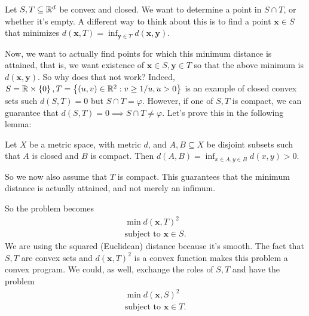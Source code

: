 Let $S,T\subseteq \mathbb{R}^d$ be convex and closed. We want to determine a point in $S\cap T$, or whether it's empty. A different way to think about this is to find a point $\pmb x\in S$ that minimizes $\displaystyle d(\pmb x,T) = \inf_{\pmb y\in T}d(\pmb x,\pmb y)$. 

Now, we want to actually find points for which this minimum distance is attained, that is, we want existence of $\pmb x\in S,\pmb y\in T$ so that the above minimum is $d(\pmb x,\pmb y)$. So why does that not work? Indeed, $S = \mathbb{R}\times \left\{0\right\}, T = \left\{(u,v)\in \mathbb{R}^2: v\geq 1/u, u>0\right\}$ is an example of closed convex sets such $d(S,T) = 0$ but $S\cap T = \varphi$. However, if one of $S,T$ is compact, we can guarantee that $d(S,T)=0\implies S\cap T \neq \varphi$. Let's prove this in the following lemma:

\begin{lemma}
Let $X$ be a metric space, with metric $d$, and $A,B\subseteq X$ be disjoint subsets such that $A$ is closed and $B$ is compact. Then $\displaystyle d(A,B) = \inf_{x\in A,y\in B} d(x,y) >0$.
\end{lemma}



So we now also assume that $T$ is compact. This guarantees that the minimum distance is actually attained, and not merely an infimum.

So the problem becomes 
\begin{align*}
\min d(\pmb x,T)^2\\
\text{subject to } \pmb x \in S.
\end{align*}
We are using the squared (Euclidean) distance because it's smooth.
The fact that $S,T$ are convex sets and $d(\pmb x,T)^2$ is a convex function makes this problem a convex program. We could, as well, exchange the roles of $S,T$ and have the problem 
\begin{align*}
\min d(\pmb x,S)^2\\
\text{subject to } \pmb x \in T.
\end{align*}




